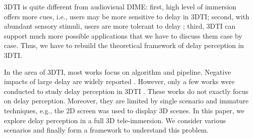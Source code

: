 3DTI is quite different from audiovisual DIME: first, high level of immersion offers more cues, i.e., users may be more sensitive to delay in 3DTI; second, with abundant sensory stimuli, users are more tolerant to delay \cite{tam2012video}; third, 3DTI can support much more possible applications that we have to discuss them case by case. Thus, we have to rebuild the theoretical framework of delay perception in 3DTI.

In the area of 3DTI, most works focus on algorithm and pipeline. Negative impacts of large delay are widely reported \cite{beck2013immersive, gibbs1999teleport, maimone2011encumbrance, kurillo2008immersive, raghuraman2015distortion}. However, only a few works were conducted to study delay perception in 3DTI \cite{wu2009quality, wu2010m, huang2012towards}. These works do not exactly focus on delay perception. Moreover, they are limited by single scenario and immature techniques, e.g., the 2D screen was used to display 3D scenes. In this paper, we explore delay perception in a full 3D tele-immersion. We consider various scenarios and finally form a framework to understand this problem.
